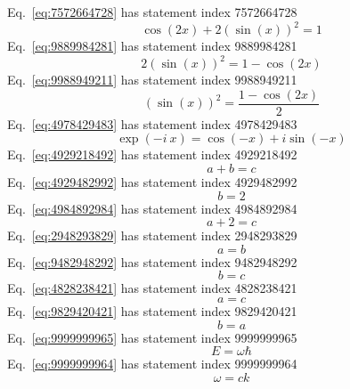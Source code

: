 \documentclass[12pt]{report}
\begin{document}
Eq.~\ref{eq:7572664728} has statement index 7572664728
\begin{equation}
\cos(2x)+2(\sin(x))^2 = 1
\label{eq:7572664728}
\end{equation}
Eq.~\ref{eq:9889984281} has statement index 9889984281
\begin{equation}
2(\sin(x))^2 = 1-\cos(2x)
\label{eq:9889984281}
\end{equation}
Eq.~\ref{eq:9988949211} has statement index 9988949211
\begin{equation}
(\sin(x))^2 = \frac{1-\cos(2x)}{2}
\label{eq:9988949211}
\end{equation}
Eq.~\ref{eq:4978429483} has statement index 4978429483
\begin{equation}
\exp(-i\ x) = \cos(-x)+i \sin(-x)
\label{eq:4978429483}
\end{equation}
Eq.~\ref{eq:4929218492} has statement index 4929218492
\begin{equation}
a+b = c
\label{eq:4929218492}
\end{equation}
Eq.~\ref{eq:4929482992} has statement index 4929482992
\begin{equation}
b = 2
\label{eq:4929482992}
\end{equation}
Eq.~\ref{eq:4984892984} has statement index 4984892984
\begin{equation}
a+2 = c
\label{eq:4984892984}
\end{equation}
Eq.~\ref{eq:2948293829} has statement index 2948293829
\begin{equation}
a = b
\label{eq:2948293829}
\end{equation}
Eq.~\ref{eq:9482948292} has statement index 9482948292
\begin{equation}
b = c
\label{eq:9482948292}
\end{equation}
Eq.~\ref{eq:4828238421} has statement index 4828238421
\begin{equation}
a = c
\label{eq:4828238421}
\end{equation}
Eq.~\ref{eq:9829420421} has statement index 9829420421
\begin{equation}
b = a
\label{eq:9829420421}
\end{equation}
Eq.~\ref{eq:9999999965} has statement index 9999999965
\begin{equation}
E = \omega \hbar
\label{eq:9999999965}
\end{equation}
Eq.~\ref{eq:9999999964} has statement index 9999999964
\begin{equation}
\omega = c k
\label{eq:9999999964}
\end{equation}
\end{document}
